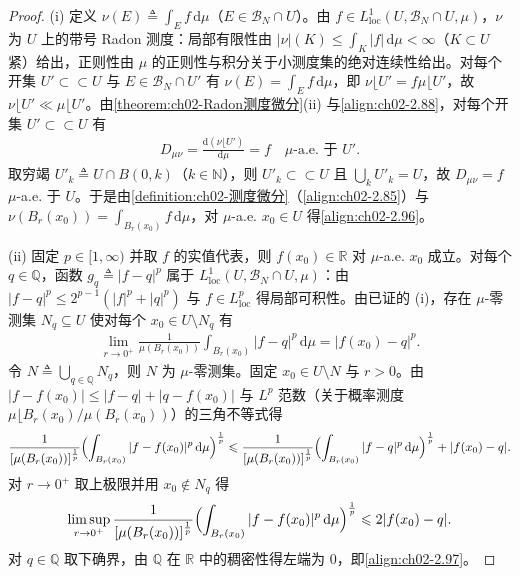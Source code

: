 \documentclass[../../main.tex]{subfiles}%
\begin{document}
\begin{proof}
(i) 定义 $\nu(E)\triangleq\int_Ef\,\mathrm{d}\mu$（$E\in\mathscr B_N\cap U$）。由 $f\in L^1_{\mathrm{loc}}(U,\mathscr B_N\cap U,\mu)$，$\nu$ 为 $U$ 上的带号 Radon 测度：局部有限性由 $|\nu|(K)\leqslant\int_K|f|\,\mathrm{d}\mu<\infty$（$K\subset U$ 紧）给出，正则性由 $\mu$ 的正则性与积分关于小测度集的绝对连续性给出。对每个开集 $U'\subset\subset U$ 与 $E\in\mathscr B_N\cap U'$ 有 $\nu(E)=\int_Ef\,\mathrm{d}\mu$，即 $\nu\lfloor U'=f\mu\lfloor U'$，故 $\nu\lfloor U'\ll\mu\lfloor U'$。由\cref{theorem:ch02-Radon测度微分}(ii) 与\eqref{align:ch02-2.88}，对每个开集 $U'\subset\subset U$ 有
\begin{align*}
D_{\mu\nu}=\frac{\mathrm{d}(\nu\lfloor U')}{\mathrm{d}\mu}=f\quad\mu\text{-a.e. 于 }U'.
\end{align*}
取穷竭 $U'_k\triangleq U\cap B(0,k)$（$k\in\mathbb N$），则 $U'_k\subset\subset U$ 且 $\bigcup_kU'_k=U$，故 $D_{\mu\nu}=f$ $\mu$-a.e. 于 $U$。于是由\cref{definition:ch02-测度微分}（\eqref{align:ch02-2.85}）与 $\nu(B_r(x_0))=\int_{B_r(x_0)}f\,\mathrm{d}\mu$，对 $\mu$-a.e. $x_0\in U$ 得\eqref{align:ch02-2.96}。

(ii) 固定 $p\in[1,\infty)$ 并取 $f$ 的实值代表，则 $f(x_0)\in\mathbb R$ 对 $\mu$-a.e. $x_0$ 成立。对每个 $q\in\mathbb Q$，函数 $g_q\triangleq|f-q|^p$ 属于 $L^1_{\mathrm{loc}}(U,\mathscr B_N\cap U,\mu)$：由 $|f-q|^p\leqslant2^{p-1}(|f|^p+|q|^p)$ 与 $f\in L^p_{\mathrm{loc}}$ 得局部可积性。由已证的 (i)，存在 $\mu$-零测集 $N_q\subseteq U$ 使对每个 $x_0\in U\setminus N_q$ 有
\begin{align*}
\lim_{r\to0^+}\frac{1}{\mu(B_r(x_0))}\int_{B_r(x_0)}|f-q|^p\,\mathrm{d}\mu=|f(x_0)-q|^p.
\end{align*}
令 $N\triangleq\bigcup_{q\in\mathbb Q}N_q$，则 $N$ 为 $\mu$-零测集。固定 $x_0\in U\setminus N$ 与 $r>0$。由 $|f-f(x_0)|\leqslant|f-q|+|q-f(x_0)|$ 与 $L^p$ 范数（关于概率测度 $\mu\lfloor B_r(x_0)/\mu(B_r(x_0))$）的三角不等式得
\begin{align*}
\frac{1}{[\mu(B_r(x_0))]^{\frac1p}}\Bigl(\int_{B_r(x_0)}|f-f(x_0)|^p\,\mathrm{d}\mu\Bigr)^{\frac1p}
\leqslant\frac{1}{[\mu(B_r(x_0))]^{\frac1p}}\Bigl(\int_{B_r(x_0)}|f-q|^p\,\mathrm{d}\mu\Bigr)^{\frac1p}+|f(x_0)-q|.
\end{align*}
对 $r\to0^+$ 取上极限并用 $x_0\notin N_q$ 得
\begin{align*}
\limsup_{r\to0^+}\frac{1}{[\mu(B_r(x_0))]^{\frac1p}}\Bigl(\int_{B_r(x_0)}|f-f(x_0)|^p\,\mathrm{d}\mu\Bigr)^{\frac1p}\leqslant2|f(x_0)-q|.
\end{align*}
对 $q\in\mathbb Q$ 取下确界，由 $\mathbb Q$ 在 $\mathbb R$ 中的稠密性得左端为 $0$，即\eqref{align:ch02-2.97}。
\end{proof}
\end{document}
